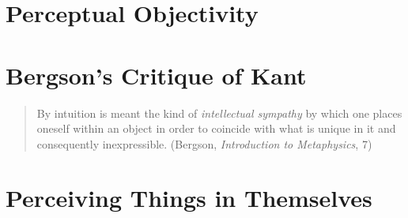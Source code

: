 
\section{Perceptual Objectivity} %
\label{sec:perceptual_objectivity}




\section{Bergson's Critique of Kant} %
\label{sec:bergson_s_critique_of_kant}

\begin{quote}
	By intuition is meant the kind of \emph{intellectual sympathy} by which one places oneself within an object in order to coincide with what is unique in it and consequently inexpressible. (Bergson, \emph{Introduction to Metaphysics}, 7)
\end{quote}


\section{Perceiving Things in Themselves} %
\label{sec:perceiving_things_in_themselves}




